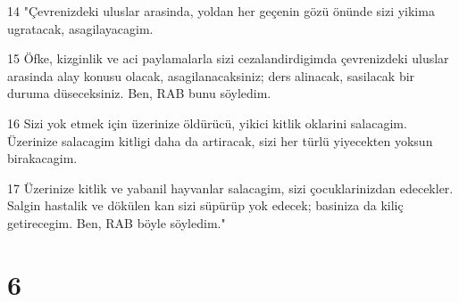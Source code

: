 \par 14 "Çevrenizdeki uluslar arasinda, yoldan her geçenin gözü önünde sizi yikima ugratacak, asagilayacagim.
\par 15 Öfke, kizginlik ve aci paylamalarla sizi cezalandirdigimda çevrenizdeki uluslar arasinda alay konusu olacak, asagilanacaksiniz; ders alinacak, sasilacak bir duruma düseceksiniz. Ben, RAB bunu söyledim.
\par 16 Sizi yok etmek için üzerinize öldürücü, yikici kitlik oklarini salacagim. Üzerinize salacagim kitligi daha da artiracak, sizi her türlü yiyecekten yoksun birakacagim.
\par 17 Üzerinize kitlik ve yabanil hayvanlar salacagim, sizi çocuklarinizdan edecekler. Salgin hastalik ve dökülen kan sizi süpürüp yok edecek; basiniza da kiliç getirecegim. Ben, RAB böyle söyledim."

\chapter{6}


